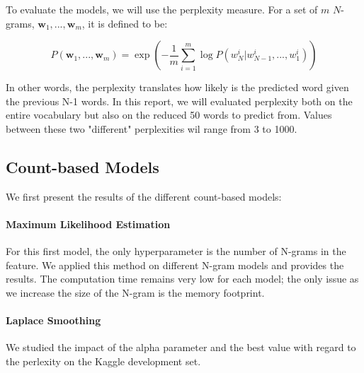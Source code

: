 \documentclass[11pt]{article}
\begin{document}
To evaluate the models, we will use the perplexity measure. For a set of $m$ $N$-grams, $\boldsymbol{w}_1,...,\boldsymbol{w}_m$, it is defined to be:

$$ P(\boldsymbol{w}_1,...,\boldsymbol{w}_m) = \exp\left(-\frac{1}{m} \sum\limits_{i = 1}^{m} \log P(w_N^i|w_{N-1}^i,...,w_1^i)\right)$$

\noindent In other words, the perplexity translates how likely is the predicted word given the previous N-1 words. In this report, we will evaluated perplexity both on the entire vocabulary but also on the reduced 50 words to predict from. Values between these two "different" perplexities wil range from 3 to 1000.

\subsection{Count-based Models}

We first present the results of the different count-based models:

\paragraph{Maximum Likelihood Estimation}

For this first model, the only hyperparameter is the number of N-grams in the feature. We applied this method on different N-gram models and provides the results. The computation time remains very low for each model; the only issue as we increase the size of the N-gram is the memory footprint.

\paragraph{Laplace Smoothing}

We studied the impact of the alpha parameter and the best value with regard to the perlexity on the Kaggle development set.
\end{document}
